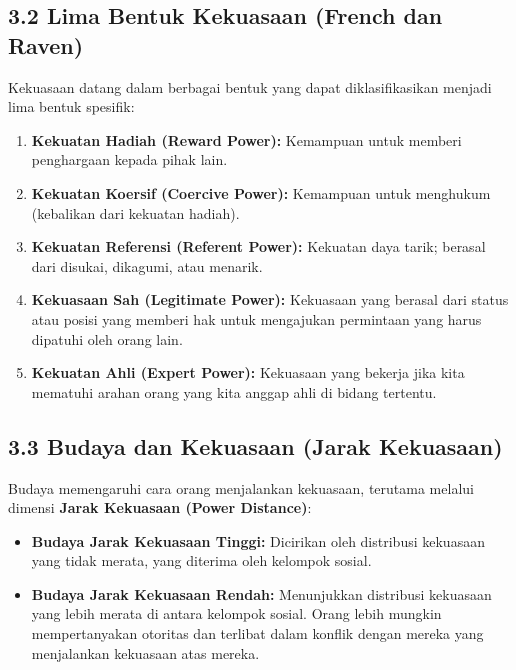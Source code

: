 \documentclass[
  letterpaper,
  DIV=11,
  numbers=noendperiod]{scrreprt}
\providecommand{\tightlist}{%
  \setlength{\itemsep}{0pt}\setlength{\parskip}{0pt}}
\begin{document}
\subsection{3.2 Lima Bentuk Kekuasaan (French dan
Raven)}\label{lima-bentuk-kekuasaan-french-dan-raven}

Kekuasaan datang dalam berbagai bentuk yang dapat diklasifikasikan
menjadi lima bentuk spesifik:

\begin{enumerate}
\def\labelenumi{\arabic{enumi}.}
\tightlist
\item
  \textbf{Kekuatan Hadiah (Reward Power):} Kemampuan untuk memberi
  penghargaan kepada pihak lain.
\item
  \textbf{Kekuatan Koersif (Coercive Power):} Kemampuan untuk menghukum
  (kebalikan dari kekuatan hadiah).
\item
  \textbf{Kekuatan Referensi (Referent Power):} Kekuatan daya tarik;
  berasal dari disukai, dikagumi, atau menarik.
\item
  \textbf{Kekuasaan Sah (Legitimate Power):} Kekuasaan yang berasal dari
  status atau posisi yang memberi hak untuk mengajukan permintaan yang
  harus dipatuhi oleh orang lain.
\item
  \textbf{Kekuatan Ahli (Expert Power):} Kekuasaan yang bekerja jika
  kita mematuhi arahan orang yang kita anggap ahli di bidang tertentu.
\end{enumerate}

\subsection{3.3 Budaya dan Kekuasaan (Jarak
Kekuasaan)}\label{budaya-dan-kekuasaan-jarak-kekuasaan}

Budaya memengaruhi cara orang menjalankan kekuasaan, terutama melalui
dimensi \textbf{Jarak Kekuasaan (Power Distance)}:

\begin{itemize}
\tightlist
\item
  \textbf{Budaya Jarak Kekuasaan Tinggi:} Dicirikan oleh distribusi
  kekuasaan yang tidak merata, yang diterima oleh kelompok sosial.
\item
  \textbf{Budaya Jarak Kekuasaan Rendah:} Menunjukkan distribusi
  kekuasaan yang lebih merata di antara kelompok sosial. Orang lebih
  mungkin mempertanyakan otoritas dan terlibat dalam konflik dengan
  mereka yang menjalankan kekuasaan atas mereka.
\end{itemize}
\end{document}
